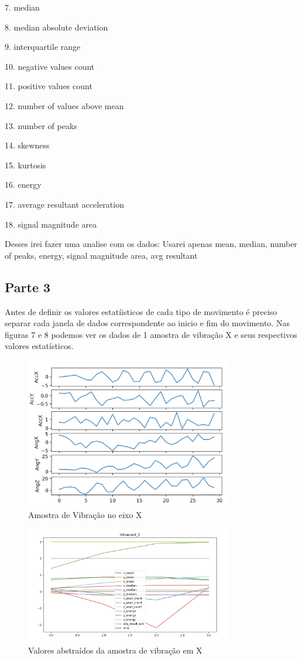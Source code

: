 7. median

8. median absolute deviation

9. interquartile range

10. negative values count

11. positive values count

12. number of values above mean

13. number of peaks

14. skewness

15. kurtosis

16. energy

17. average resultant acceleration

18. signal magnitude area


Desses irei fazer uma analise com os dados:
Usarei apenas mean, median, number of peaks, energy, signal magnitude area, avg resultant


\subsection*{Parte 3}


Antes de definir os valores estatíisticos de cada tipo de movimento é preciso separar cada janela de dados correspondente ao inicio e fim do movimento.
Nas figuras 7 e 8 podemos ver os dados de 1 amostra de vibração X e seus respectivos valores estatísticos.


\begin{figure}[H]
    \center
    \includegraphics[width=9cm]{images/VibracaoX_1_raw.png}
    \caption{Amostra de Vibração no eixo X}
\end{figure}

\begin{figure}[H]
    \center
    \includegraphics[width=9cm]{images/VibracaoX_1_stats.png}
    \caption{ Valores abstraídos da amostra de vibração em X }
\end{figure}


